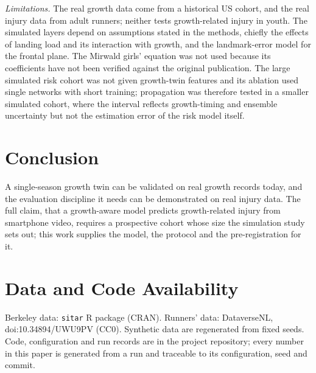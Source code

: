 \documentclass[journal]{IEEEtran}
\begin{document}
\emph{Limitations.} The real growth data come from a historical US cohort, and the real injury
data from adult runners; neither tests growth-related injury in youth. The simulated layers
depend on assumptions stated in the methods, chiefly the effects of landing load and its
interaction with growth, and the landmark-error model for the frontal plane. The Mirwald girls'
equation was not used because its coefficients have not been verified against the original
publication. The large simulated risk cohort was not given growth-twin features and its ablation used
single networks with short training; propagation was therefore tested in a smaller simulated
cohort, where the interval reflects growth-timing and ensemble uncertainty but not the
estimation error of the risk model itself.

\section{Conclusion}
A single-season growth twin can be validated on real growth records today, and the evaluation
discipline it needs can be demonstrated on real injury data. The full claim, that a growth-aware
model predicts growth-related injury from smartphone video, requires a prospective cohort whose
size the simulation study sets out; this work supplies the model, the protocol and the
pre-registration for it.

\section*{Data and Code Availability}
Berkeley data: \texttt{sitar} R package (CRAN). Runners' data: DataverseNL,
doi:10.34894/UWU9PV (CC0). Synthetic data are regenerated from fixed seeds. Code, configuration
and run records are in the project repository; every number in this paper is generated from a
run and traceable to its configuration, seed and commit.



\end{document}
